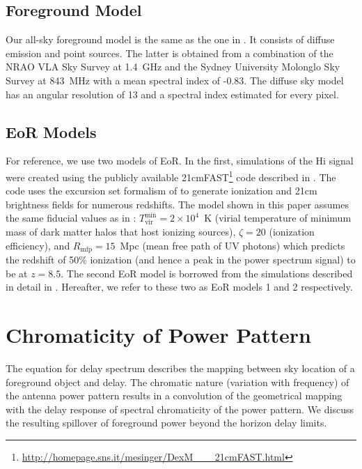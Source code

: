 \documentclass[preprint2,iop,numberedappendix,twocolappendix,appendixfloats]{emulateapj}
\begin{document}
\subsection{Foreground Model}\label{sec:foreground}

Our all-sky foreground model is the same as the one in \citet{thy15a}. It consists of diffuse emission \citep{deo08} and point sources. The latter is obtained from a combination of the NRAO VLA Sky Survey \citep[NVSS;][]{con98} at 1.4~GHz and the Sydney University Molonglo Sky Survey \citep[SUMSS;][]{boc99,mau03} at 843~MHz with a mean spectral index of -0.83. The diffuse sky model has an angular resolution of 13 and a spectral index estimated for every pixel.

\subsection{EoR Models}\label{sec:EoR-model}

For reference, we use two models of EoR. In the first, simulations of the H{\sc i} signal were created using the publicly available 21cmFAST\footnote{\url{http://homepage.sns.it/mesinger/DexM\_\_\_21cmFAST.html}} code described in \citet{mes11}. The code uses the excursion set formalism of \citet{fur04a} to generate ionization and 21cm brightness fields for numerous redshifts. The model shown in this paper assumes the same fiducial values as in \citet{ewa16}: $T_\text{vir}^\text{min} = 2 \times 10^4$~K (virial temperature of minimum mass of dark matter halos that host ionizing sources), $\zeta = 20$ (ionization efficiency), and $R_\text{mfp}=15$~Mpc (mean free path of UV photons) which predicts the redshift of 50\% ionization (and hence a peak in the power spectrum signal) to be at $z=8.5$. The second EoR model is borrowed from the simulations described in detail in \citet{lid08}. Hereafter, we refer to these two as EoR models 1 and 2 respectively. 

\section{Chromaticity of Power Pattern}\label{sec:beam-chromaticity}

The equation for delay spectrum describes the mapping between sky location of a foreground object and delay. The chromatic nature (variation with frequency) of the antenna power pattern results in a convolution of the geometrical mapping with the delay response of spectral chromaticity of the power pattern. We discuss the resulting spillover of foreground power beyond the horizon delay limits.
\end{document}
